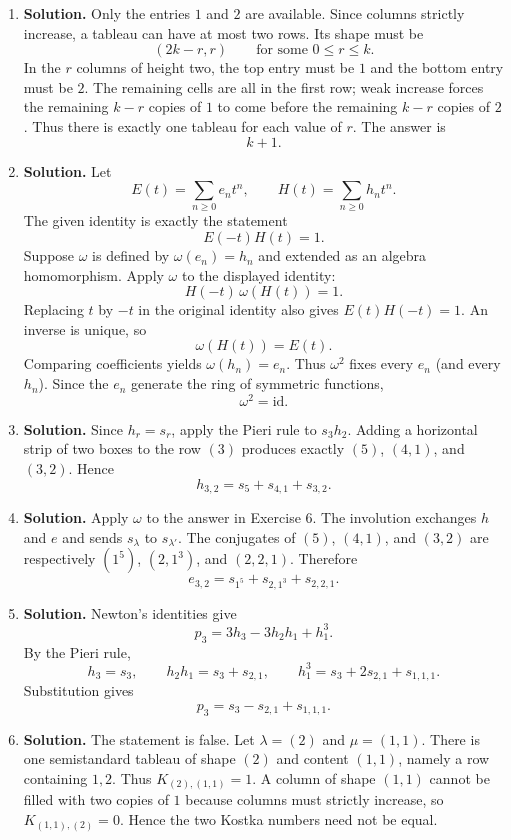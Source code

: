 \documentclass{article}
\begin{document}
\begin{enumerate}
\item \textbf{Solution.}
Only the entries $1$ and $2$ are available.  Since columns strictly
increase, a tableau can have at most two rows.  Its shape must be
\[
(2k-r,r)\qquad\text{for some }0\leq r\leq k.
\]
In the $r$ columns of height two, the top entry must be $1$ and the
bottom entry must be $2$.  The remaining cells are all in the first
row; weak increase forces the remaining $k-r$ copies of $1$ to come
before the remaining $k-r$ copies of $2$.  Thus there is exactly one
tableau for each value of $r$.  The answer is
\[
\boxed{k+1.}
\]

\item \textbf{Solution.}
Let
\[
E(t)=\sum_{n\geq0}e_nt^n,\qquad
H(t)=\sum_{n\geq0}h_nt^n.
\]
The given identity is exactly the statement
\[
E(-t)H(t)=1.
\]
Suppose $\omega$ is defined by $\omega(e_n)=h_n$ and extended as an
algebra homomorphism.  Apply $\omega$ to the displayed identity:
\[
H(-t)\,\omega(H(t))=1.
\]
Replacing $t$ by $-t$ in the original identity also gives
$E(t)H(-t)=1$.  An inverse is unique, so
\[
\omega(H(t))=E(t).
\]
Comparing coefficients yields $\omega(h_n)=e_n$.  Thus $\omega^2$
fixes every $e_n$ (and every $h_n$).  Since the $e_n$ generate the
ring of symmetric functions,
\[
\boxed{\omega^2=\mathrm{id}.}
\]

\item \textbf{Solution.}
Since $h_r=s_r$, apply the Pieri rule to $s_3h_2$.  Adding a
horizontal strip of two boxes to the row $(3)$ produces exactly
$(5)$, $(4,1)$, and $(3,2)$.  Hence
\[
\boxed{h_{3,2}=s_5+s_{4,1}+s_{3,2}.}
\]

\item \textbf{Solution.}
Apply $\omega$ to the answer in Exercise 6.  The involution exchanges
$h$ and $e$ and sends $s_\lambda$ to $s_{\lambda'}$.  The conjugates
of $(5)$, $(4,1)$, and $(3,2)$ are respectively
$(1^5)$, $(2,1^3)$, and $(2,2,1)$.  Therefore
\[
\boxed{e_{3,2}=s_{1^5}+s_{2,1^3}+s_{2,2,1}.}
\]

\item \textbf{Solution.}
Newton's identities give
\[
p_3=3h_3-3h_2h_1+h_1^3.
\]
By the Pieri rule,
\[
h_3=s_3,\qquad
h_2h_1=s_3+s_{2,1},\qquad
h_1^3=s_3+2s_{2,1}+s_{1,1,1}.
\]
Substitution gives
\[
\boxed{p_3=s_3-s_{2,1}+s_{1,1,1}.}
\]

\item \textbf{Solution.}
The statement is false.  Let $\lambda=(2)$ and $\mu=(1,1)$.  There is
one semistandard tableau of shape $(2)$ and content $(1,1)$, namely a
row containing $1,2$.  Thus $K_{(2),(1,1)}=1$.  A column of shape
$(1,1)$ cannot be filled with two copies of $1$ because columns must
strictly increase, so $K_{(1,1),(2)}=0$.  Hence the two Kostka numbers
need not be equal.


\end{enumerate}
\end{document}
